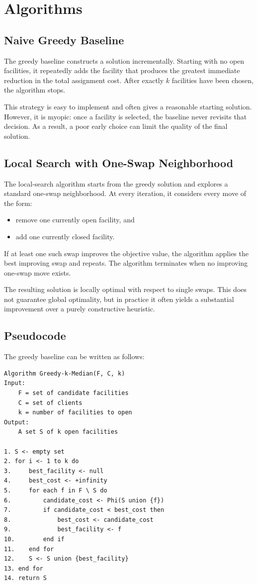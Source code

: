 \documentclass[11pt]{article}
\begin{document}
\section{Algorithms}
\subsection{Naive Greedy Baseline}
The greedy baseline constructs a solution incrementally. Starting with no open facilities, it repeatedly adds the facility that produces the greatest immediate reduction in the total assignment cost. After exactly $k$ facilities have been chosen, the algorithm stops.

This strategy is easy to implement and often gives a reasonable starting solution. However, it is myopic: once a facility is selected, the baseline never revisits that decision. As a result, a poor early choice can limit the quality of the final solution.

\subsection{Local Search with One-Swap Neighborhood}
The local-search algorithm starts from the greedy solution and explores a standard one-swap neighborhood. At every iteration, it considers every move of the form:
\begin{itemize}
    \item remove one currently open facility, and
    \item add one currently closed facility.
\end{itemize}
If at least one such swap improves the objective value, the algorithm applies the best improving swap and repeats. The algorithm terminates when no improving one-swap move exists.

The resulting solution is locally optimal with respect to single swaps. This does not guarantee global optimality, but in practice it often yields a substantial improvement over a purely constructive heuristic.

\subsection{Pseudocode}
The greedy baseline can be written as follows:

\begin{Verbatim}[frame=single,fontsize=\normalsize]
Algorithm Greedy-k-Median(F, C, k)
Input:
    F = set of candidate facilities
    C = set of clients
    k = number of facilities to open
Output:
    A set S of k open facilities

1. S <- empty set
2. for i <- 1 to k do
3.     best_facility <- null
4.     best_cost <- +infinity
5.     for each f in F \ S do
6.         candidate_cost <- Phi(S union {f})
7.         if candidate_cost < best_cost then
8.             best_cost <- candidate_cost
9.             best_facility <- f
10.        end if
11.    end for
12.    S <- S union {best_facility}
13. end for
14. return S
\end{Verbatim}
\end{document}
